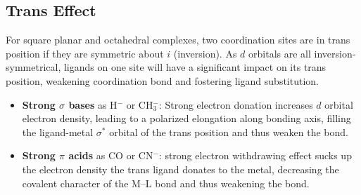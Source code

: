 \subsection{Trans Effect}
For square planar and octahedral complexes, two coordination sites are in trans position if they are symmetric about $i$ (inversion).
As $d$ orbitals are all inversion-symmetrical, ligands on one site will have a significant impact on its trans position, 
weakening coordination bond and fostering ligand substitution. 
\begin{itemize}
\item \textbf{Strong $\sigma$ bases} as H$^-$ or CH$_3^-$: Strong electron donation increases $d$ orbital electron density, 
leading to a polarized elongation along bonding axis, filling the ligand-metal $\sigma^*$ orbital of the trans position and thus weaken the bond.
\item \textbf{Strong $\pi$ acids} as CO or CN$^-$: strong electron withdrawing effect sucks up the electron density the trans ligand donates to the metal, 
decreasing the covalent character of the M--L bond and thus weakening the bond.
\end{itemize}